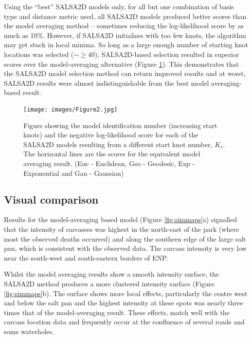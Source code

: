 \documentclass[letterpaper, 12pt]{interact}
\begin{document}
	
	
	Using the ``best'' SALSA2D models only, for all but one combination of basis type and distance metric used, all SALSA2D models produced better scores than the model averaging method -- sometimes reducing the log-likelihood score by as much as 10\%. However, if SALSA2D initialises with too few knots, the algorithm may get stuck in local minima. So long as a large enough number of starting knot locations was selected ($\sim\geq 40$), SALSA2D-based selection resulted in superior scores over the model-averaging alternative (Figure \ref{fig:simresults}). This demonstrates that the SALSA2D model selection method can return improved results and at worst, SALSA2D results were almost indistinguishable from the best model averaging-based result.
	
	
	\begin{figure}[!ht]
		\centering
		\texttt{[image: images/Figure2.jpg]}
		\caption{Figure showing the model identification number (increasing start knots) and the negative log-likelihood score for each of the SALSA2D models resulting from a different start knot number, $K_s$. The horizontal lines are the scores for the equivalent model averaging result. (Euc - Euclidean, Geo - Geodesic, Exp - Exponential and Gau - Gaussian)}
		\label{fig:simresults}
	\end{figure}
	
	
	\subsection*{Visual comparison}\label{visual-comparison}
	
	Results for the model-averaging based model (Figure \ref{fig:simmaps}a) signalled that the intensity of carcasses was highest in the north-east of the park (where most the observed deaths occurred) and along the southern edge of the large salt pan, which is consistent with the observed data. The carcass intensity is very low near the south-west and south-eastern borders of ENP.
	
	Whilst the model averaging results show a smooth intensity surface, the SALSA2D method produces a more clustered intensity surface (Figure \ref{fig:simmaps}b). The surface shows more local effects, particularly the centre west and below the salt pan and the highest intensity at these spots was nearly three times that of the model-averaging result. These effects, match well with the carcass location data and frequently occur at the confluence of several roads and some waterholes. 
	
\end{document}
